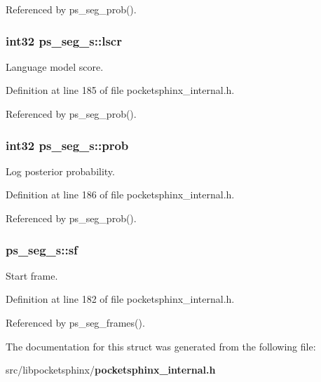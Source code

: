 Referenced by ps\-\_\-seg\-\_\-prob().

\subsubsection[{lscr}]{\setlength{\rightskip}{0pt plus 5cm}int32 ps\-\_\-seg\-\_\-s\-::lscr}\label{structps__seg__s_a69e605f422eeed1a9c67437e8ddd8b08}


Language model score. 



Definition at line 185 of file pocketsphinx\-\_\-internal.\-h.



Referenced by ps\-\_\-seg\-\_\-prob().

\subsubsection[{prob}]{\setlength{\rightskip}{0pt plus 5cm}int32 ps\-\_\-seg\-\_\-s\-::prob}\label{structps__seg__s_ae683244d90d0a5339930b47757778432}


Log posterior probability. 



Definition at line 186 of file pocketsphinx\-\_\-internal.\-h.



Referenced by ps\-\_\-seg\-\_\-prob().

\subsubsection[{sf}]{ ps\-\_\-seg\-\_\-s\-::sf}\label{structps__seg__s_a885a599726cd0efba573d106d016e6e2}


Start frame. 



Definition at line 182 of file pocketsphinx\-\_\-internal.\-h.



Referenced by ps\-\_\-seg\-\_\-frames().



The documentation for this struct was generated from the following file\-:\begin{DoxyCompactItemize}
\item 
src/libpocketsphinx/{\bf pocketsphinx\-\_\-internal.\-h}\end{DoxyCompactItemize}
